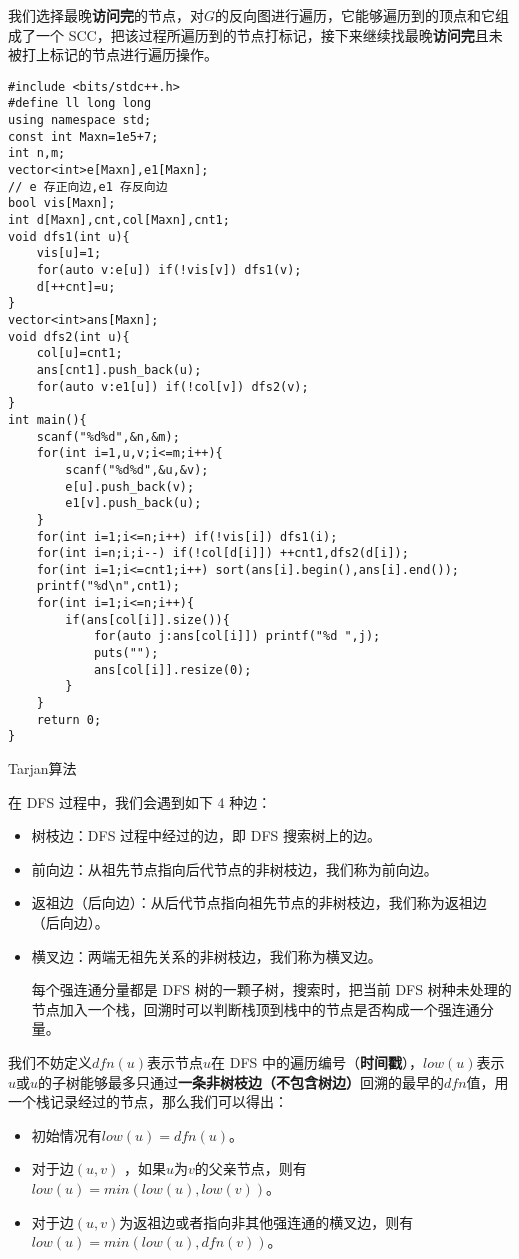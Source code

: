 \documentclass[]{article}
\providecommand{\tightlist}{%
  \setlength{\itemsep}{0pt}\setlength{\parskip}{0pt}}
\begin{document}
我们选择最晚\textbf{访问完}的节点，对\(G\)的反向图进行遍历，它能够遍历到的顶点和它组成了一个
SCC，把该过程所遍历到的节点打标记，接下来继续找最晚\textbf{访问完}且未被打上标记的节点进行遍历操作。

\begin{verbatim}
#include <bits/stdc++.h>
#define ll long long
using namespace std;
const int Maxn=1e5+7;
int n,m;
vector<int>e[Maxn],e1[Maxn];
// e 存正向边,e1 存反向边 
bool vis[Maxn];
int d[Maxn],cnt,col[Maxn],cnt1;
void dfs1(int u){
    vis[u]=1;
    for(auto v:e[u]) if(!vis[v]) dfs1(v);
    d[++cnt]=u;
}
vector<int>ans[Maxn];
void dfs2(int u){
    col[u]=cnt1;
    ans[cnt1].push_back(u);
    for(auto v:e1[u]) if(!col[v]) dfs2(v);
}
int main(){
    scanf("%d%d",&n,&m);
    for(int i=1,u,v;i<=m;i++){
        scanf("%d%d",&u,&v);
        e[u].push_back(v);
        e1[v].push_back(u);
    }
    for(int i=1;i<=n;i++) if(!vis[i]) dfs1(i);
    for(int i=n;i;i--) if(!col[d[i]]) ++cnt1,dfs2(d[i]);
    for(int i=1;i<=cnt1;i++) sort(ans[i].begin(),ans[i].end());
    printf("%d\n",cnt1);
    for(int i=1;i<=n;i++){
        if(ans[col[i]].size()){
            for(auto j:ans[col[i]]) printf("%d ",j);
            puts("");
            ans[col[i]].resize(0);
        }
    }
    return 0;
}
\end{verbatim}

Tarjan算法

在 DFS 过程中，我们会遇到如下 4 种边：

\begin{itemize}
\item
  树枝边：DFS 过程中经过的边，即 DFS 搜索树上的边。
\item
  前向边：从祖先节点指向后代节点的非树枝边，我们称为前向边。
\item
  返祖边（后向边）：从后代节点指向祖先节点的非树枝边，我们称为返祖边（后向边）。
\item
  横叉边：两端无祖先关系的非树枝边，我们称为横叉边。

  每个强连通分量都是 DFS 树的一颗子树，搜索时，把当前 DFS
  树种未处理的节点加入一个栈，回溯时可以判断栈顶到栈中的节点是否构成一个强连通分量。
\end{itemize}

我们不妨定义\(dfn(u)\)表示节点\(u\)在 DFS
中的遍历编号（\textbf{时间戳}），\(low(u)\)表示\(u\)或\(u\)的子树能够最多只通过\textbf{一条非树枝边（不包含树边）}回溯的最早的\(dfn\)值，用一个栈记录经过的节点，那么我们可以得出：

\begin{itemize}
\tightlist
\item
  初始情况有\(low(u)=dfn(u)\)。
\item
  对于边\((u,v)\)
  ，如果\(u\)为\(v\)的父亲节点，则有\(low(u)=min(low(u),low(v))\)。
\item
  对于边\((u,v)\)为返祖边或者指向非其他强连通的横叉边，则有\(low(u)=min(low(u),dfn(v))\)。
\end{itemize}
\end{document}
